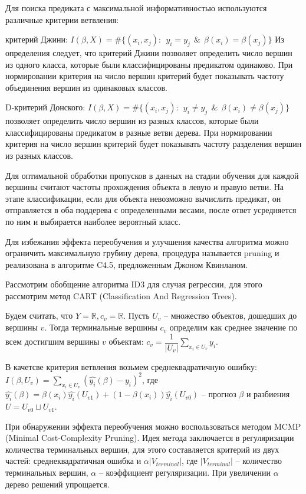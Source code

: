 Для поиска предиката с максимальной информативностью используются различные критерии ветвления:
\begin{description}[font=$\bullet$]
    \item критерий Джини: $I(\beta, X) = \#\{ (x_i,x_j):~~ y_i = y_j ~~\&~~ \beta(x_i) = \beta(x_j) \} $ Из определения следует, что критерий Джини позволяет определить число вершин из одного класса, которые были классифицированы предикатом одинаково. При нормировании критерия на число вершин критерий будет показывать частоту объединения вершин из одинаковых классов.
    \item D-критерий Донского: $I(\beta, X) = \#\{ (x_i,x_j):~~ y_i \neq y_j ~~\&~~ \beta(x_i) \neq \beta(x_j) \} $ позволяет определить число вершин из разных классов, которые были классифицированы предикатом в разные ветви дерева. При нормировании критерия на число вершин критерий будет показывать частоту разделения вершин из разных классов.
\end{description}

Для оптимальной обработки пропусков в данных на стадии обучения для каждой вершины считают частоты прохождения объекта в левую и правую ветви. На этапе классификации, если для объекта невозможно вычислить предикат, он отправляется в оба поддерева с определенными весами, после ответ усредняется по ним и выбирается наиболее вероятный класс.

Для избежания эффекта переобучения и улучшения качества алгоритма можно ограничить максимальную грубину дерева, процедура называется pruning и реализована в алгоритме C4.5, предложенным Джоном Квинланом.

Рассмотрим обобщение алгоритма ID3 для случая регрессии, для этого рассмотрим метод CART (Classification And Regression Trees).

Будем считать, что $Y = \mathbb{R}, c_v = \mathbb{R}$.
Пусть $U_v$ -- множество объектов, дошедших до вершины $v$. Тогда терминальные вершины $c_v$ определим как среднее значение по всем достигшим вершины $v$ объектам: $c_v = \dfrac{1}{|U_v|}\sum\limits_{x_i \in U_v} y_i$.

В качетсве критерия ветвления возьмем среднеквадратичную ошибку: $I(\beta, U_v) = \sum\limits_{x_i \in U_v} (\hat{y_i}(\beta) - y_i)^2$, где $\hat{y_i}(\beta) = \beta(x_i)\hat{y_i}(U_{v1}) + (1 - \beta(x_i))\hat{y_i}(U_{v0})$ -- прогноз $\beta$ и разбиения $U = U_{v0} \sqcup U_{v1}$.

При обнаружении эффекта переобучения можно воспользоваться методом MCMP (Minimal Cost-Complexity Pruning). Идея метода заключается в регуляризации количества терминальных вершин, для этого составляется критерий из двух частей: среднеквадратичная ошибка и $\alpha |V_{terminal}|$, где $|V_{terminal}|$ -- количество терминальных вершин, $\alpha$ -- коэффициент регуляризации. При увеличении $\alpha$ дерево решений упрощается.


